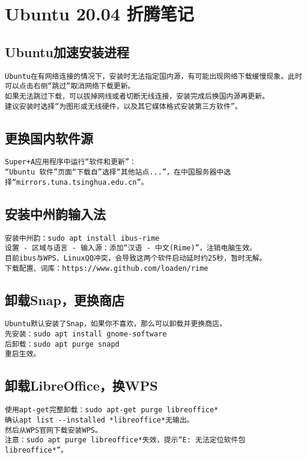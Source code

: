 \documentclass[a4paper,fontset=fandol,zihao=-4,linespread=1.2,oneside]{ctexbook}
\begin{document}
\chapter{Ubuntu 20.04 折腾笔记}

\section{Ubuntu加速安装进程}
\begin{lstlisting}
Ubuntu在有网络连接的情况下，安装时无法指定国内源，有可能出现网络下载缓慢现象。此时可以点击右侧“跳过”取消网络下载更新。
如果无法跳过下载，可以拔掉网线或者切断无线连接，安装完成后换国内源再更新。
建议安装时选择“为图形或无线硬件，以及其它媒体格式安装第三方软件”。
\end{lstlisting}

\section{更换国内软件源}
\begin{lstlisting}
Super+A应用程序中运行“软件和更新”：
“Ubuntu 软件”页面“下载自”选择“其他站点...”，在中国服务器中选择“mirrors.tuna.tsinghua.edu.cn”。
\end{lstlisting}

\section{安装中州韵输入法}
\begin{lstlisting}
安装中州韵：sudo apt install ibus-rime
设置 - 区域与语言 - 输入源：添加“汉语 - 中文(Rime)”，注销电脑生效。
目前ibus与WPS、LinuxQQ冲突，会导致这两个软件启动延时约25秒，暂时无解。
下载配置、词库：https://www.github.com/loaden/rime
\end{lstlisting}

\section{卸载Snap，更换商店}
\begin{lstlisting}
Ubuntu默认安装了Snap，如果你不喜欢，那么可以卸载并更换商店。
先安装：sudo apt install gnome-software
后卸载：sudo apt purge snapd
重启生效。
\end{lstlisting}

\section{卸载LibreOffice，换WPS}
\begin{lstlisting}
使用apt-get完整卸载：sudo apt-get purge libreoffice*
确认apt list --installed *libreoffice*无输出。
然后从WPS官网下载安装WPS。
注意：sudo apt purge libreoffice*失效，提示“E: 无法定位软件包 libreoffice*”。
\end{lstlisting}
\end{document}
